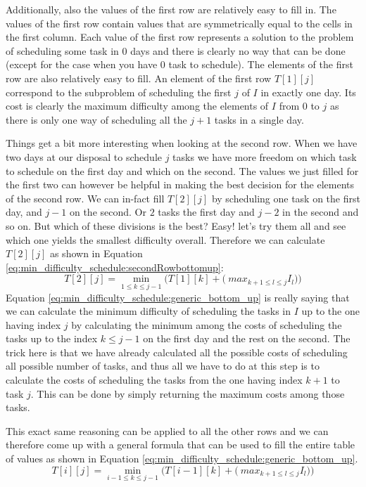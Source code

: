 Additionally, also the values of the first row are relatively easy to fill in. The values of the
first row contain values that are symmetrically equal to the cells in the first column. Each value
of the first row represents a solution to the problem of scheduling some task in $0$ days and there
is clearly no way that can be done (except for the case when you have $0$ task to schedule). The
elements of the first row are also relatively easy to fill. An element of the first row $T[1][j]$
correspond to the subproblem of scheduling the first $j$ of $I$ in exactly one day. Its cost is
clearly the maximum difficulty among the elements of $I$ from $0$ to $j$ as there is only one way of
scheduling all the $j+1$ tasks in a single day.

Things get a bit more interesting when looking at the second row. When we have two days at our
disposal to schedule $j$ tasks we have more freedom on which task to schedule on the first day and
which on the second. The values we just filled for the first two can however be helpful in making
the best decision for the elements of the second row. We can in-fact fill $T[2][j]$ by scheduling
one task on the first day, and $j-1$ on the second. Or $2$ tasks the first day and $j-2$ in the
second and so on. But which of these divisions is the best? Easy! let's try them all and see which
one yields the smallest difficulty overall. Therefore we can calculate $T[2][j]$  as shown in
Equation \ref{eq:min_difficulty_schedule:secondRowbottomup}:
\begin{equation}
    T[2][j] = \min_{1 \leq k \leq j-1} \Big( T[1][k] + \big(\ max_{k+1 \leq l \leq j }I_l \big)  \Big)
\label{eq:min_difficulty_schedule:secondRowbottomup}
\end{equation}
Equation \ref{eq:min_difficulty_schedule:generic_bottom_up} is really saying that we can calculate
the minimum difficulty of scheduling the tasks in $I$ up to the one having index $j$ by calculating
the minimum among the costs of scheduling the tasks up to the index $k \leq j-1$ on the first day
and the rest on the second. The trick here is that we have already calculated all the possible costs
of scheduling all possible number of tasks, and thus all we have to do at this step is to calculate
the costs of scheduling the tasks from the one having index $k+1$ to task $j$. This can be done by
simply returning the maximum costs among those tasks.

This exact same reasoning can be applied to all the other rows and we can therefore come up with a
general formula that can be used to fill the entire table of values as shown in Equation
\ref{eq:min_difficulty_schedule:generic_bottom_up}.
\begin{equation}
    T[i][j] = \min_{i-1 \leq k \leq j-1} \Big( T[i-1][k] + \big(\ max_{k+1 \leq l \leq j }I_l \big)  \Big)
    \label{eq:min_difficulty_schedule:generic_bottom_up}
\end{equation}

